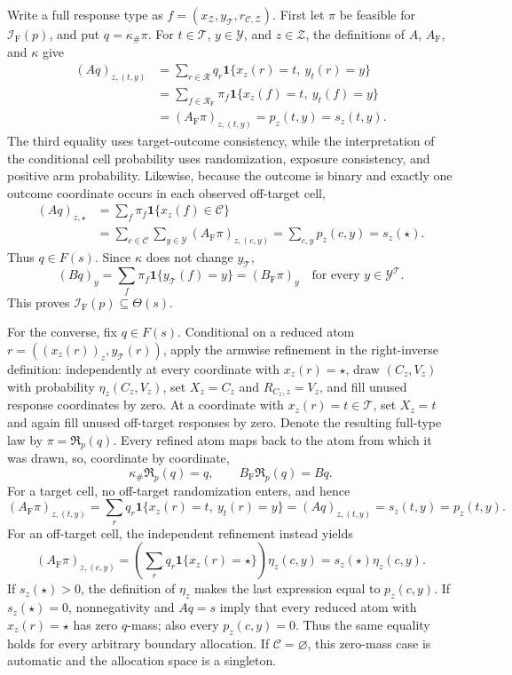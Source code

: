 Write a full response type as \(f=(x_{\mathcal Z},y_{\mathcal T},r_{\mathcal C,\mathcal Z})\).  First let \(\pi\) be feasible for \(\mathcal I_{\mathrm F}(p)\), and put \(q=\kappa_{\#}\pi\).  For \(t\in\mathcal T\), \(y\in\mathcal Y\), and \(z\in\mathcal Z\), the definitions of \(A\), \(A_{\mathrm F}\), and \(\kappa\) give
\[
\begin{aligned}
(Aq)_{z,(t,y)}
 &=\sum_{r\in\mathcal R}q_r\mathbf 1\{x_z(r)=t,\ y_t(r)=y\}\\
 &=\sum_{f\in\mathcal R_{\mathrm F}}\pi_f\mathbf 1\{x_z(f)=t,\ y_t(f)=y\}\\
 &=(A_{\mathrm F}\pi)_{z,(t,y)}=p_z(t,y)=s_z(t,y).
\end{aligned}
\]
The third equality uses target-outcome consistency, while the interpretation of the conditional cell probability uses randomization, exposure consistency, and positive arm probability.  Likewise, because the outcome is binary and exactly one outcome coordinate occurs in each observed off-target cell,
\[
\begin{aligned}
(Aq)_{z,\star}
 &=\sum_f\pi_f\mathbf 1\{x_z(f)\in\mathcal C\}\\
 &=\sum_{c\in\mathcal C}\sum_{y\in\mathcal Y}(A_{\mathrm F}\pi)_{z,(c,y)}
 =\sum_{c,y}p_z(c,y)=s_z(\star).
\end{aligned}
\]
Thus \(q\in F(s)\).  Since \(\kappa\) does not change \(y_{\mathcal T}\),
\[
(Bq)_y=\sum_f\pi_f\mathbf 1\{y_{\mathcal T}(f)=y\}=(B_{\mathrm F}\pi)_y
\quad\text{for every }y\in\mathcal Y^{\mathcal T}.
\]
This proves \(\mathcal I_{\mathrm F}(p)\subseteq\Theta(s)\).

For the converse, fix \(q\in F(s)\).  Conditional on a reduced atom \(r=((x_z(r))_z,y_{\mathcal T}(r))\), apply the armwise refinement in the right-inverse definition: independently at every coordinate with \(x_z(r)=\star\), draw \((C_z,V_z)\) with probability \(\eta_z(C_z,V_z)\), set \(X_z=C_z\) and \(R_{C_z,z}=V_z\), and fill unused response coordinates by zero.  At a coordinate with \(x_z(r)=t\in\mathcal T\), set \(X_z=t\) and again fill unused off-target responses by zero.  Denote the resulting full-type law by \(\pi=\mathfrak R_p(q)\).  Every refined atom maps back to the atom from which it was drawn, so, coordinate by coordinate,
\[
\kappa_{\#}\mathfrak R_p(q)=q,
\qquad
B_{\mathrm F}\mathfrak R_p(q)=Bq.
\]
For a target cell, no off-target randomization enters, and hence
\[
(A_{\mathrm F}\pi)_{z,(t,y)}
=\sum_rq_r\mathbf 1\{x_z(r)=t,\ y_t(r)=y\}
=(Aq)_{z,(t,y)}=s_z(t,y)=p_z(t,y).
\]
For an off-target cell, the independent refinement instead yields
\[
(A_{\mathrm F}\pi)_{z,(c,y)}
=\left(\sum_rq_r\mathbf 1\{x_z(r)=\star\}\right)\eta_z(c,y)
=s_z(\star)\eta_z(c,y).
\]
If \(s_z(\star)>0\), the definition of \(\eta_z\) makes the last expression equal to \(p_z(c,y)\).  If \(s_z(\star)=0\), nonnegativity and \(Aq=s\) imply that every reduced atom with \(x_z(r)=\star\) has zero \(q\)-mass; also every \(p_z(c,y)=0\).  Thus the same equality holds for every arbitrary boundary allocation.  If \(\mathcal C=\varnothing\), this zero-mass case is automatic and the allocation space is a singleton.

